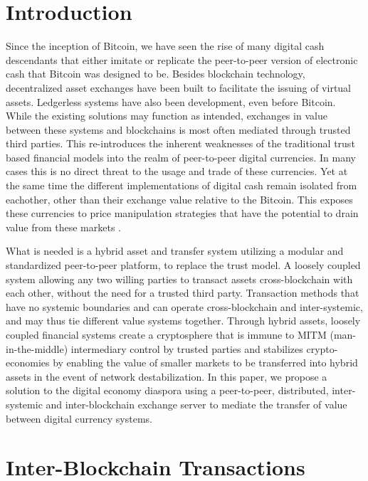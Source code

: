 \documentclass[11pt, a4paper]{article}
\begin{document}
\newpage

\section{Introduction}

Since the inception of Bitcoin, we have seen the rise of many digital
cash descendants that either imitate or replicate the peer-to-peer
version of electronic cash that Bitcoin was designed to be. Besides
blockchain technology, decentralized asset exchanges\cite{counterparty}
have been built to facilitate the issuing of virtual assets. Ledgerless
\cite{opentransactions} systems have also been development, even before
Bitcoin. While the existing solutions may function as intended,
exchanges in value between these systems and blockchains is most often
mediated through trusted third parties. This re-introduces the inherent
weaknesses of the traditional trust based financial models into the
realm of peer-to-peer digital currencies. In many cases this is no
direct threat to the usage and trade of these currencies. Yet at the
same time the different implementations of digital cash remain isolated
from eachother, other than their exchange value relative to the Bitcoin.
This exposes these currencies to price manipulation strategies that have
the potential to drain value from these markets \cite{panture}.

What is needed is a hybrid asset and transfer system utilizing a modular and standardized peer-to-peer platform, to replace the trust model. A loosely coupled system\cite{EDA} allowing any two willing parties to transact assets cross-blockchain with each other, without the need for a trusted third party. Transaction methods that have no systemic boundaries and can operate cross-blockchain and inter-systemic, and may thus tie different value systems together. Through hybrid assets, loosely coupled financial systems create a cryptosphere that is immune to MITM (man-in-the-middle) intermediary control by trusted parties and stabilizes crypto-economies by enabling the value of smaller markets to be transferred into hybrid assets in the event of network destabilization. In this paper, we propose a solution to the digital economy diaspora using a peer-to-peer, distributed, inter-systemic and inter-blockchain exchange server to mediate the transfer of value between digital currency systems.


\section{Inter-Blockchain Transactions}
\end{document}

